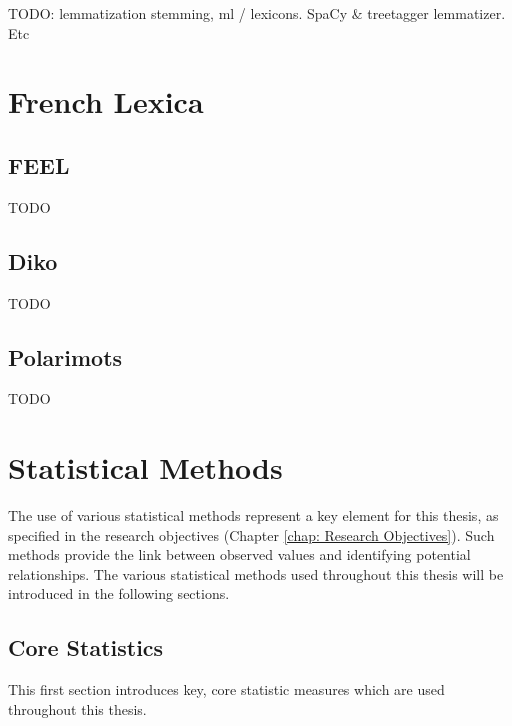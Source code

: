 TODO: lemmatization stemming, ml / lexicons. SpaCy \& treetagger lemmatizer. Etc
\label{lemmatization}


\section{French Lexica}\label{French Lexicons}

\subsection{FEEL}\label{chap: feel}

TODO

\subsection{Diko}\label{chap: diko}

TODO

\subsection{Polarimots}\label{chap: polarimots}

TODO

\section{Statistical Methods}\label{Statistical Methods}

The use of various statistical methods represent a key element for this thesis, as specified in the research objectives (Chapter \ref{chap: Research Objectives}). Such methods provide the link between observed values and identifying potential relationships. The various statistical methods used throughout this thesis will be introduced in the following sections.

\subsection{Core Statistics}

This first section introduces key, core statistic measures which are used throughout this thesis.

